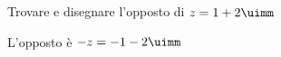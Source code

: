 	Trovare e disegnare l'opposto di $z=1+2\uimm$
	
	L'opposto è $-z=-1-2\uimm$
	\begin{center}
		
		\label{fig:disegnopianocomplesso03}
	\end{center}
